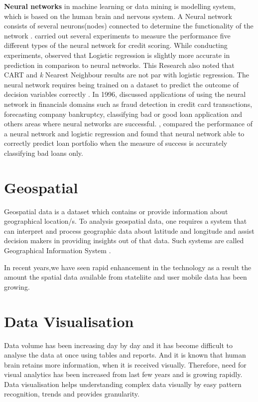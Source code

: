 {\textbf{Neural networks} in machine learning or data mining is modelling system, which is based on the human brain and nervous system. A Neural network consists of several neurons(nodes) connected to determine the functionality of the network \citep{demuth2008neural}. \citet{west2000neural} carried out several experiments to measure the performance five different types of the neural network for credit scoring. While conducting experiments, \citet{west2000neural} observed that Logistic regression is slightly more accurate in prediction in comparison to neural networks. This Research also noted that CART and \emph{k} Nearest Neighbour results are not par with logistic regression. The neural network requires being trained on a dataset to predict the outcome of decision variables correctly \citep{presky1996functional}. In 1996, \cite{gately1995neural} discussed applications of using the neural network in financials domains such as fraud detection in credit card transactions, forecasting company bankruptcy, classifying bad or good loan application and others areas where neural networks are successful\citep{ghosh1994credit}. \citet{desai1996comparison}, compared the performance of a neural network and logistic regression and found that neural network able to correctly predict loan portfolio when the measure of success is accurately classifying bad loans only.

\section{Geospatial}

Geospatial data is a dataset which contains or provide information about geographical location/s. To analysis geospatial data, one requires a system that can interpret and process geographic data about latitude and longitude and assist decision makers in providing insights out of that data. Such systems are called Geographical Information System \citep{keenan1998spatial}.


In recent years,we have seen rapid enhancement in the technology as a result the amount the spatial data available from stateliite and user mobile data has been growing.

\section{Data Visualisation}
Data volume has been increasing day by day and it has become difficult to analyse the data at once using tables and reports. And it is known that human brain retains more information, when it is received visually. Therefore, need for visual analytics has been increased from last few years and is growing rapidly. Data visualisation helps understanding complex data visually by easy pattern recognition, trends and provides granularity.\\\\


}
